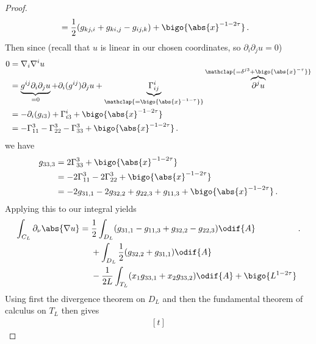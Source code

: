\documentclass[titlepage,numbers=noenddot,oneside,%
cleardoublepage=empty,paper=a4,fontsize=11pt,%
english,%
]{scrartcl}
\newcommand*{\mathfullstop}{\,.}
\begin{document}
\begin{proof}
\begin{equation}
\begin{aligned}[t]
            &=\frac{1}{2}(g_{kj,i}+g_{ki,j}-g_{ij,k})+\bigo{\abs{x}^{-1-2\tau}}\mathfullstop
        \end{aligned}
    \end{equation}
    Then since (recall that \( u \) is linear in our chosen coordinates, so \( \partial_i\partial_j u=0 \))
    \begin{equation*}
        \begin{aligned}[t]
            0&=\nabla_i \nabla^i u\\
            &=\underbrace{g^{ij}\partial_i \partial_j u}_{=0}+\partial_i(g^{ij}) \partial_j u+\underbrace{\Gamma^{i}_{ij}}_{\mathclap{=\bigo{\abs{x}^{-1-\tau}}}}\overbrace{\partial^j u}^{\smash{\mathclap{=\delta^{j3}+\bigo{\abs{x}^{-\tau}}}}}\\
            &=-\partial_i(g_{i3})+\Gamma^i_{i3}+\bigo{\abs{x}^{-1-2\tau}}\\
            &=-\Gamma^3_{11}-\Gamma^3_{22}-\Gamma^3_{33}+\bigo{\abs{x}^{-1-2\tau}}\mathfullstop
        \end{aligned}
    \end{equation*}
    we have
    \begin{equation*}
        \begin{aligned}[t]
            g_{33,3}&=2\Gamma_{33}^3+\bigo{\abs{x}^{-1-2\tau}}\\
            &=-2\Gamma_{11}^3-2\Gamma_{22}^3+\bigo{\abs{x}^{-1-2\tau}}\\
            &=-2g_{31,1}-2g_{32,2}+g_{22,3}+g_{11,3}+\bigo{\abs{x}^{-1-2\tau}}\mathfullstop
        \end{aligned}
    \end{equation*}
    Applying this to our integral yields
    \begin{equation*}
            \int_{C_L} \partial_{\nu}\abs{\nabla u}=\begin{aligned}[t]
                &\frac{1}{2}\int_{D_L}(g_{31,1}-g_{11,3}+g_{32,2}-g_{22,3})\odif{A}\\
                &+\int_{D_L}\frac{1}{2}(g_{32,2}+g_{31,1})\odif{A}\\
                &-\frac{1}{2L}\int_{T_L}(x_1 g_{33,1}+x_2 g_{33,2})\odif{A}+\bigo{L^{1-2\tau}}
            \end{aligned}\mathfullstop
    \end{equation*}
    Using first the divergence theorem on \( D_L \) and then the fundamental theorem of calculus on \( T_L \) then gives
    \begin{equation*}
        \begin{aligned}[t]

\end{aligned}
\end{equation*}
\end{proof}
\end{document}
